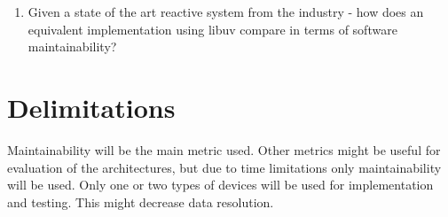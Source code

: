 \begin{enumerate}

  \item Given a state of the art reactive system from the industry - how does
    an equivalent implementation using libuv compare in terms of software
    maintainability?

\end{enumerate}

\section{Delimitations}
\label{sec:delimitations}

Maintainability will be the main metric used. Other metrics might be useful for
evaluation of the architectures, but due to time limitations only
maintainability will be used. Only one or two types of devices will be used for
implementation and testing. This might decrease data resolution.
